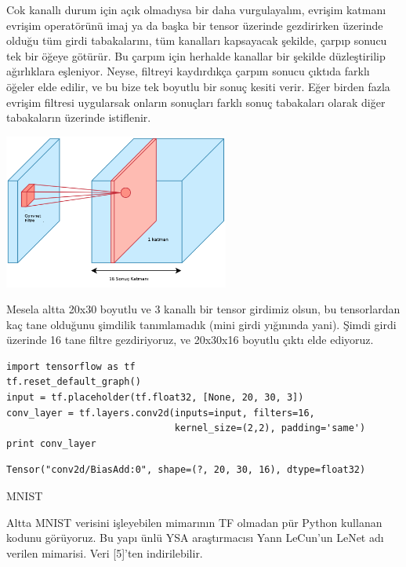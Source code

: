 \documentclass[12pt,fleqn]{article}\usepackage{../../common}
\begin{document}
Cok kanallı durum için açık olmadıysa bir daha vurgulayalım, evrişim
katmanı evrişim operatörünü imaj ya da başka bir tensor üzerinde
gezdirirken üzerinde olduğu tüm girdi tabakalarını, tüm kanalları
kapsayacak şekilde, çarpıp sonucu tek bir öğeye götürür. Bu çarpım için
herhalde kanallar bir şekilde düzleştirilip ağırlıklara eşleniyor. Neyse,
filtreyi kaydırdıkça çarpım sonucu çıktıda farklı öğeler elde edilir, ve bu
bize tek boyutlu bir sonuç kesiti verir. Eğer birden fazla evrişim filtresi
uygularsak onların sonuçları farklı sonuç tabakaları olarak diğer
tabakaların üzerinde istiflenir.

\includegraphics[width=20em]{conv-11.png}

Mesela altta 20x30 boyutlu ve 3 kanallı bir tensor girdimiz olsun, bu
tensorlardan kaç tane olduğunu şimdilik tanımlamadık (mini girdi yığınında
yani). Şimdi girdi üzerinde 16 tane filtre gezdiriyoruz, ve 20x30x16
boyutlu çıktı elde ediyoruz.

\begin{verbatim}
import tensorflow as tf
tf.reset_default_graph()
input = tf.placeholder(tf.float32, [None, 20, 30, 3])
conv_layer = tf.layers.conv2d(inputs=input, filters=16, 
                              kernel_size=(2,2), padding='same')
print conv_layer
\end{verbatim}

\begin{verbatim}
Tensor("conv2d/BiasAdd:0", shape=(?, 20, 30, 16), dtype=float32)
\end{verbatim}

MNIST

Altta MNIST verisini işleyebilen mimarının TF olmadan pür Python kullanan
kodunu görüyoruz. Bu yapı ünlü YSA araştırmacısı Yann LeCun'un LeNet adı
verilen mimarisi. Veri [5]'ten indirilebilir.

\inputminted[fontsize=\footnotesize]{python}{convnet2.py}
\end{document}
